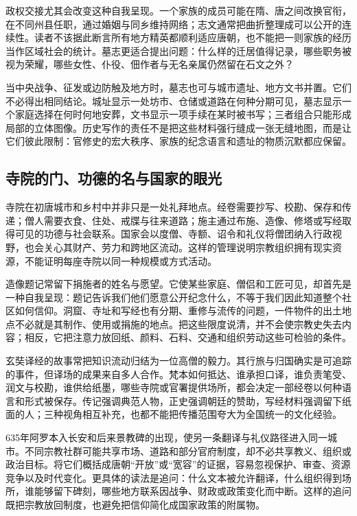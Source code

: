 政权交接尤其会改变这种自我呈现。一个家族的成员可能在隋、唐之间改换官衔，在不同州县任职，通过婚姻与同乡维持网络；志文通常把曲折整理成可以公开的连续性。读者不该据此断言所有地方精英都顺利适应唐朝，也不能把一则家族的经历当作区域社会的统计。墓志更适合提出问题：什么样的迁居值得记录，哪些职务被视为荣耀，哪些女性、仆役、佃作者与无名亲属仍然留在石文之外？

当中央战争、征发或边防触及地方时，墓志也可与城市遗址、地方文书并置。它们不必得出相同结论。城址显示一处坊市、仓储或道路在何种分期可见，墓志显示一个家庭选择在何时何地安葬，文书显示一项手续在某时被书写；三者组合只能形成局部的立体图像。历史写作的责任不是把这些材料强行缝成一张无缝地图，而是让它们彼此限制：官修史的宏大秩序、家族的纪念语言和遗址的物质沉默都应保留。

\subsection{寺院的门、功德的名与国家的眼光}
寺院在初唐城市和乡村中并非只是一处礼拜地点。经卷需要抄写、校勘、保存和传递；僧人需要衣食、住处、戒牒与往来道路；施主通过布施、造像、修塔或写经取得可见的功德与社会联系。国家会以度僧、寺额、诏令和礼仪将僧团纳入行政视野，也会关心其财产、劳力和跨地区流动。这样的管理说明宗教组织拥有现实资源，不能证明每座寺院以同一种规模或方式活动。

造像题记常留下捐施者的姓名与愿望。它使某些家庭、僧侣和工匠可见，却首先是一种自我呈现：题记告诉我们他们愿意公开纪念什么，不等于我们因此知道整个社区如何信仰。洞窟、寺址和写经也有分期、重修与流传的问题，一件物件的出土地点不必就是其制作、使用或捐施的地点。把这些限度说清，并不会使宗教史失去内容；相反，它把注意力放回纸、颜料、石料、交通和组织劳动这些可检验的条件。

玄奘译经的故事常把知识流动归结为一位高僧的毅力。其行旅与归国确实是可追踪的事件，但译场的成果来自多人合作。梵本如何抵达、谁承担口译，谁负责笔受、润文与校勘，谁供给纸墨，哪些寺院或官署提供场所，都会决定一部经卷以何种语言和形式被保存。传记强调典范人物，正史强调朝廷的赞助，写经材料强调留下纸面的人；三种视角相互补充，也都不能把传播范围夸大为全国统一的文化经验。

635年阿罗本入长安和后来景教碑的出现，使另一条翻译与礼仪路径进入同一城市。不同宗教社群可能共享市场、道路和部分官府制度，却不必共享教义、组织或政治目标。将它们概括成唐朝“开放”或“宽容”的证据，容易忽视保护、审查、资源竞争以及时代变化。更具体的读法是追问：什么文本被允许翻译，什么组织得到场所，谁能够留下碑刻，哪些地方联系因战争、财政或政策变化而中断。这样的追问既把宗教放回制度，也避免把信仰简化成国家政策的附属物。

